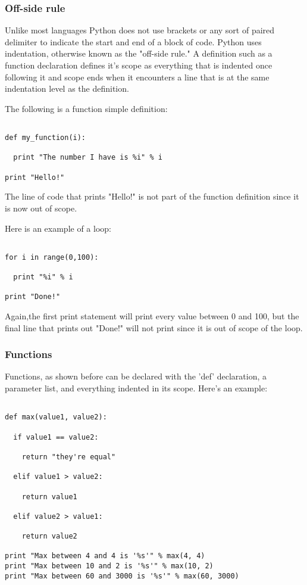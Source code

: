 \documentclass[12pt]{article}
\begin{document}
\subsubsection*{Off-side rule}

Unlike most languages Python does not use brackets or any sort of paired delimiter to indicate the start and end of a block of code. Python uses indentation, otherwise known as the "off-side rule." A definition such as a function declaration defines it's scope as everything that is indented once following it and scope ends when it encounters a line that is at the same indentation level as the definition. 

The following is a function simple definition:
\begin{verbatim}

def my_function(i):

  print "The number I have is %i" % i

print "Hello!"

\end{verbatim}

The line of code that prints "Hello!" is not part of the function definition since it is now out of scope.


Here is an example of a loop:
\begin{verbatim}

for i in range(0,100):

  print "%i" % i

print "Done!"
\end{verbatim}

Again,the first print statement will print every value between 0 and 100, but the final line that prints out "Done!" will not print since it is out of scope of the loop.


\subsubsection*{Functions}

Functions, as shown before can be declared with the 'def' declaration, a parameter list, and everything indented in its scope. Here's an example:

\begin{verbatim}

def max(value1, value2):

  if value1 == value2:
  
    return "they're equal"
  
  elif value1 > value2:
  
    return value1
    
  elif value2 > value1:
  
    return value2
    
print "Max between 4 and 4 is '%s'" % max(4, 4)
print "Max between 10 and 2 is '%s'" % max(10, 2)
print "Max between 60 and 3000 is '%s'" % max(60, 3000)

\end{verbatim}
\end{document}
